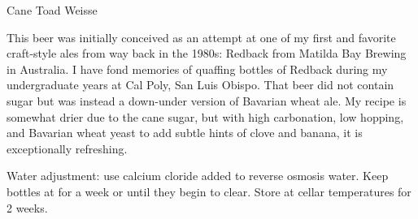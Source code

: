 \begin{recipie}{Cane Toad Weisse}

\begin{aboutblock}
This beer was initially conceived as an attempt at one of my first and favorite
craft-style ales from way back in the 1980s: Redback from Matilda Bay Brewing
in Australia. I have fond memories of quaffing bottles of Redback during my
undergraduate years at Cal Poly, San Luis Obispo. That beer did not contain
sugar but was instead a down-under version of Bavarian wheat ale. My recipe is
somewhat drier due to the cane sugar, but with high carbonation, low hopping,
and Bavarian wheat yeast to add subtle hints of clove and banana, it is exceptionally
refreshing. 
\end{aboutblock}


\begin{methodandtiming}
 
\begin{mashsteps}
\end{mashsteps}

\begin{fermentationsteps}
\end{fermentationsteps}

\begin{directions}
Water adjustment: use  calcium cloride added to reverse osmosis water. 
Keep bottles at  for a week or until they begin to clear. Store at cellar
temperatures for 2 weeks.
\end{directions}

\end{methodandtiming}

\pagebreak

\begin{ingredientsblock}
    
\begin{malts}
\end{malts}

\begin{hops}

\end{hops}


\end{ingredientsblock}

\end{recipie}

